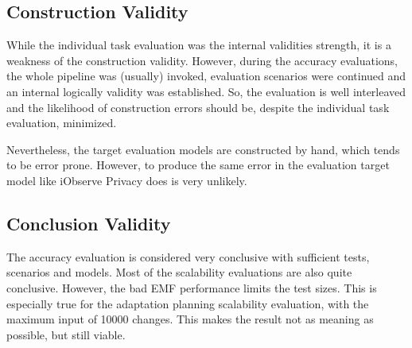 

\subsection{Construction Validity}

While the individual task evaluation was the internal validities strength, it is a weakness of the construction validity. However, during the accuracy evaluations, the whole pipeline was (usually) invoked, evaluation scenarios were continued and an internal logically validity was established. So, the evaluation is well interleaved and the likelihood of construction errors should be, despite the individual task evaluation, minimized.

Nevertheless, the target evaluation models are constructed by hand, which tends to be error prone. However, to produce the same error in the evaluation target model like iObserve Privacy does is very unlikely.

\subsection{Conclusion Validity}

The accuracy evaluation is considered very conclusive with sufficient tests, scenarios and models. Most of the scalability evaluations are also quite conclusive. However, the bad EMF performance limits the test sizes. This is especially true for the adaptation planning scalability evaluation, with the maximum input of 10000 changes. This makes the result not as meaning as possible, but still viable.


